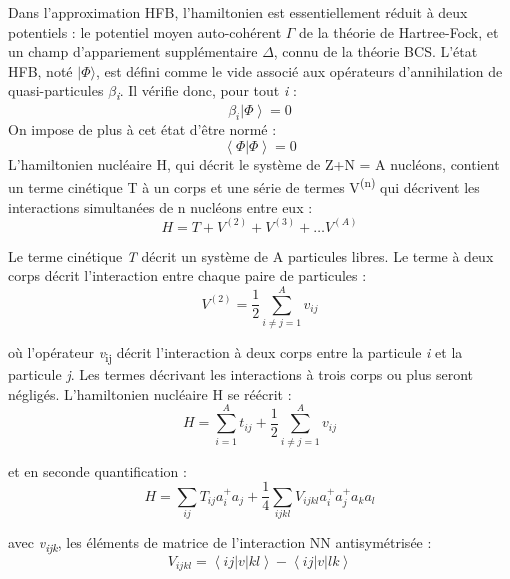  Dans l'approximation HFB, l'hamiltonien est essentiellement réduit à deux potentiels : le potentiel moyen
auto-cohérent \textcolor[rgb]{0.1254902,0.12941177,0.13333334}{$\Gamma $} de la théorie de Hartree-Fock, et un champ
d'appariement supplémentaire $\Delta $, connu de la théorie BCS.
 L'état HFB, noté $ | \Phi \rangle $, est défini comme le vide associé aux opérateurs d'annihilation de
quasi-particules \textit{$\beta $}\textit{\textsubscript{i}}. Il vérifie donc, pour tout \textit{i} :
 \begin{equation} \beta _i| \left.\Phi \right\rangle =0 \end{equation}
On impose de plus à cet état d'être normé :
 \begin{equation} \left\langle \Phi \left|\Phi \right.\right\rangle
=0\end{equation}
L'hamiltonien nucléaire H, qui décrit le système de Z+N = A nucléons, contient un terme cinétique T à un corps et une
série de termes V\textsuperscript{(n)} qui décrivent les interactions simultanées de n nucléons entre eux :
 \begin{equation}H=T+V^{\left(2\right)}+V^{\left(3\right)}+{\dots}V^{\left(A\right)}\end{equation}

Le terme cinétique \textit{T} décrit un système de A particules libres. Le terme à deux corps décrit l'interaction entre
chaque paire de particules :
 \begin{equation}
V^{\left(2\right)}=\frac 1 2\sum
_{i{\neq}j=1}^Av_{\mathit{ij}}\end{equation}

où l'opérateur \textit{v}\textsubscript{ij }décrit l'interaction à deux corps entre la particule \textit{i} et la
particule \textit{j}. Les termes décrivant les interactions à trois corps ou plus seront négligés. L'hamiltonien
nucléaire H se réécrit :
 \begin{equation}H=\sum
_{i=1}^At_{\mathit{ij}}+\frac 1 2\sum
_{i{\neq}j=1}^Av_{\mathit{ij}}\end{equation}

et en seconde quantification :
\begin{equation}H=\sum _{\mathit{ij}}T_{\mathit{ij}}a_i^+a_j+\frac{1}{4} \sum_{\mathit{ijkl}}V_{\mathit{ijkl}}a_i^+a_j^+a_k a_l\end{equation}

avec \textit{v}\textit{\textsubscript{ijk}}, les éléments de matrice de l'interaction NN antisymétrisée :
\begin{equation}V_{\mathit{ijkl}}=\left\langle \mathit{ij}\left|v\left|\mathit{kl}\right.\right.\right\rangle -\left\langle
\mathit{ij}\left|v\left|\mathit{lk}\right.\right.\right\rangle
\end{equation} 

